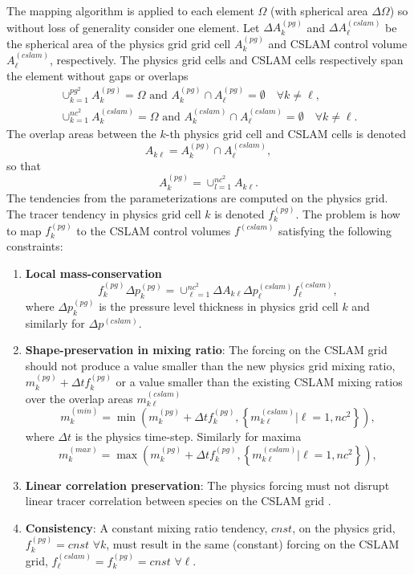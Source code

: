 The mapping algorithm is applied to each element $\Omega$ (with spherical area $\Delta \Omega$) so without loss of generality consider one element. Let $\Delta A^{(pg)}_k$ and $\Delta A^{(cslam)}_\ell$ be the spherical area of the physics grid grid cell $A^{(pg)}_k$ and CSLAM control volume $A^{(cslam)}_\ell$, respectively. The physics grid cells and CSLAM cells respectively span the element without gaps or overlaps
\begin{eqnarray}
\cup_{k=1}^{pg^2}A^{(pg)}_k=\Omega \text{ and } A^{(pg)}_k \cap A^{(pg)}_\ell = \emptyset \quad \forall k\ne \ell,\\
\cup_{k=1}^{nc^2}A^{(cslam)}_k=\Omega \text{ and } A^{(cslam)}_k \cap A^{(cslam)}_\ell = \emptyset \quad \forall k\ne \ell.
\end{eqnarray}
The overlap areas between the $k$-th physics grid cell and CSLAM cells is denoted
\begin{equation}
A_{k\ell}=A^{(pg)}_k \cap A^{(cslam)}_\ell,
\end{equation}
so that
\begin{equation}
A^{(pg)}_k=\cup_{l=1}^{nc^2}A_{k\ell}.
\end{equation}
The tendencies from the parameterizations are computed on the physics grid. The tracer tendency in physics grid cell $k$ is denoted $f_k^{(pg)}$. The problem is how to map $f_k^{(pg)}$ to the CSLAM control volumes $f^{(cslam)}$ satisfying the following constraints:
\begin{enumerate}
\item {\bf{Local mass-conservation}}
\begin{equation}
f_k^{(pg)}\Delta p^{(pg)}_k=\cup_{\ell=1}^{nc^2}\Delta A_{k\ell}\Delta p^{(cslam)}_\ell f^{(cslam)}_\ell,
\end{equation}
where $\Delta p^{(pg)}_k$ is the pressure level thickness in physics grid cell $k$ and similarly for $\Delta p^{(cslam)}$.
\item {\bf{Shape-preservation in mixing ratio}}: The forcing on the CSLAM grid should not produce a value smaller than the new physics grid mixing ratio, $m^{(pg)}_k+\Delta tf_k^{(pg)}$ or a value smaller than the existing CSLAM mixing ratios over the overlap areas $m^{(cslam)}_{k\ell}$
\begin{equation}
m_k^{(min)}=\min \left( m^{(pg)}_k+\Delta t f_k^{(pg)},\left\{ m^{(cslam)}_{k\ell} |\ell=1,nc^2\right\} \right),
\end{equation}
where $\Delta t$ is the physics time-step. Similarly for maxima
\begin{equation}
m_k^{(max)}=\max \left( m^{(pg)}_k+\Delta t f_k^{(pg)},\left\{ m^{(cslam)}_{k\ell} |\ell=1,nc^2\right\} \right),
\end{equation}
\item {\bf{Linear correlation preservation}}: The physics forcing must not disrupt linear tracer correlation between species on the CSLAM grid \citep[see, e.g., ][]{LT2011QJR}.
\item {\bf{Consistency}}: A constant mixing ratio tendency, $cnst$, on the physics grid, $f_k^{(pg)}=cnst$ $\forall k$, must result in the same (constant) forcing on the CSLAM grid, $f_\ell^{(cslam)}=f_k^{(pg)}=cnst$ $\forall \ell$.
\end{enumerate}
